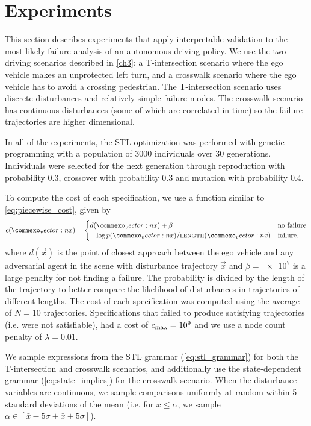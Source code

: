 \section{Experiments}
This section describes experiments that apply interpretable validation to the most likely failure analysis of an autonomous driving policy. We use the two driving scenarios described in \cref{ch3}: a T-intersection scenario where the ego vehicle makes an unprotected left turn, and a crosswalk scenario where the ego vehicle has to avoid a crossing pedestrian. The T-intersection scenario uses discrete disturbances and relatively simple failure modes. The crosswalk scenario has continuous disturbances (some of which are correlated in time) so the failure trajectories are higher dimensional. 

In all of the experiments, the STL optimization was performed with genetic programming with a population of \num{3000} individuals over \num{30} generations. Individuals were selected for the next generation through reproduction with probability \num{0.3}, crossover with probability \num{0.3} and mutation with probability \num{0.4}.

To compute the cost of each specification, we use a function similar to \cref{eq:piecewise_cost}, given by
\begin{equation}
    c(\vec{x}) = \begin{cases}
        d(\vec{x}) + \beta  & \text{no failure} \\
        -\log p(\vec{x}) / \textproc{length}(\vec{x}) & \text{failure} \text{.} 
    \end{cases}
\end{equation}
where $d(\vec{x})$ is the point of closest approach between the ego vehicle and any adversarial agent in the scene with disturbance trajectory $\vec{x}$ and $\beta = \num{e7}$ is a large penalty for not finding a failure. The probability is divided by the length of the trajectory to better compare the likelihood of disturbances in trajectories of different lengths. The cost of each specification was computed using the average of $N=10$ trajectories. Specifications that failed to produce satisfying trajectories (i.e. were not satisfiable), had a cost of $c_{\rm max} = \num{e9}$ and we use a node count penalty of $\lambda = 0.01$. 

We sample expressions from the STL grammar (\cref{eq:stl_grammar}) for both the T-intersection and crosswalk scenarios, and additionally use the state-dependent grammar (\cref{eq:state_implies}) for the crosswalk scenario. When the disturbance variables are continuous, we sample comparisons uniformly at random within \num{5} standard deviations of the mean (i.e. for $x \leq \alpha$, we sample $\alpha \in [\bar{x}-5\sigma + \bar{x} + 5 \sigma]$). 


